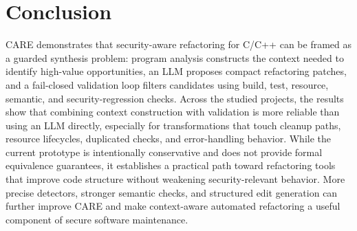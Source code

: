 \providecommand{\SysName}{CARE}

\section{Conclusion}
\label{sec:conclusion}

\SysName{} demonstrates that security-aware refactoring for C/C++ can be framed
as a guarded synthesis problem: program analysis constructs the context needed
to identify high-value opportunities, an LLM proposes compact refactoring
patches, and a fail-closed validation loop filters candidates using build,
test, resource, semantic, and security-regression checks. Across the studied
projects, the results show that combining context construction with validation
is more reliable than using an LLM directly, especially for transformations
that touch cleanup paths, resource lifecycles, duplicated checks, and
error-handling behavior. While the current prototype is intentionally
conservative and does not provide formal equivalence guarantees, it establishes
a practical path toward refactoring tools that improve code structure without
weakening security-relevant behavior. More precise detectors, stronger semantic
checks, and structured edit generation can further improve \SysName{} and make
context-aware automated refactoring a useful component of secure software
maintenance.
